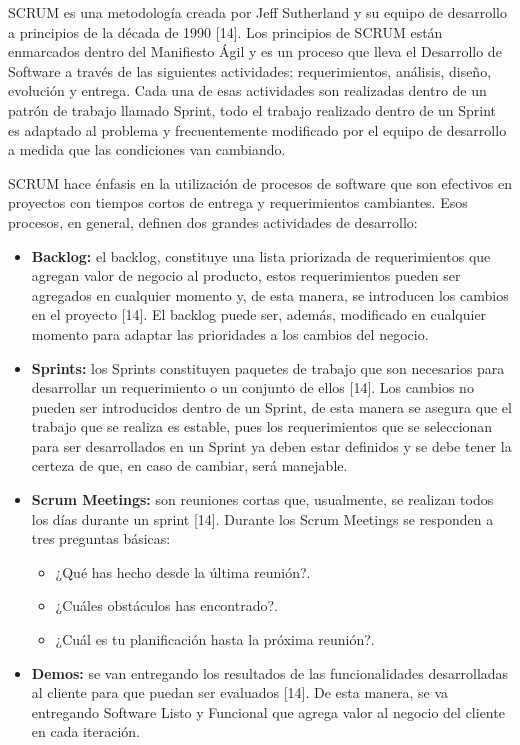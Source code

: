 SCRUM es una metodología creada por Jeff Sutherland y su equipo de desarrollo a principios de la década de 1990 [14]. Los principios de SCRUM están enmarcados dentro del Manifiesto Ágil y es un proceso que lleva el Desarrollo de Software a través de las siguientes actividades: requerimientos, análisis, diseño, evolución y entrega. Cada una de esas actividades son realizadas dentro de un patrón de trabajo llamado Sprint, todo el trabajo realizado dentro de un Sprint es adaptado al problema y frecuentemente modificado por el equipo de desarrollo a medida que las condiciones van cambiando.

SCRUM hace énfasis en la utilización de procesos de software que son efectivos en proyectos con tiempos cortos de entrega y requerimientos cambiantes. Esos procesos, en general, definen dos grandes actividades de desarrollo:

\begin{itemize}
\item \textbf{Backlog:} el backlog, constituye una lista priorizada de requerimientos que agregan valor de negocio al producto, estos requerimientos pueden ser agregados en cualquier momento y, de esta manera, se introducen los cambios en el proyecto [14]. El backlog puede ser, además, modificado en cualquier momento para adaptar las prioridades a los cambios del negocio.
\item \textbf{Sprints:} los Sprints constituyen paquetes de trabajo que son necesarios para desarrollar un requerimiento o un conjunto de ellos [14]. Los cambios no pueden ser introducidos dentro de un Sprint, de esta manera se asegura que el trabajo que se realiza es estable, pues los requerimientos que se seleccionan para ser desarrollados en un Sprint ya deben estar definidos y se debe tener la certeza de que, en caso de cambiar, será manejable.
\item \textbf{Scrum Meetings:} son reuniones cortas que, usualmente, se realizan todos los días durante un sprint [14]. Durante los Scrum Meetings se responden a tres preguntas básicas:
\begin{itemize}
\item ¿Qué has hecho desde la última reunión?.
\item ¿Cuáles obstáculos has encontrado?.
\item ¿Cuál es tu planificación hasta la próxima reunión?.
\end{itemize}
\item \textbf{Demos:} se van entregando los resultados de las funcionalidades desarrolladas al cliente para que puedan ser evaluados [14]. De esta manera, se va entregando Software Listo y Funcional que agrega valor al negocio del cliente en cada iteración.
\end{itemize}

